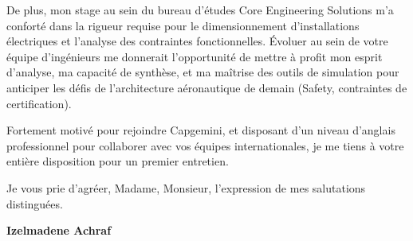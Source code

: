 \documentclass[10pt,a4paper]{../../altacv}
\begin{document}
\vspace{0.4cm}

De plus, mon stage au sein du bureau d'études Core Engineering Solutions m'a conforté dans la rigueur requise pour le dimensionnement d'installations électriques et l'analyse des contraintes fonctionnelles. Évoluer au sein de votre équipe d'ingénieurs me donnerait l'opportunité de mettre à profit mon esprit d'analyse, ma capacité de synthèse, et ma maîtrise des outils de simulation pour anticiper les défis de l'architecture aéronautique de demain (Safety, contraintes de certification).

\vspace{0.4cm}

Fortement motivé pour rejoindre Capgemini, et disposant d'un niveau d'anglais professionnel pour collaborer avec vos équipes internationales, je me tiens à votre entière disposition pour un premier entretien.

\vspace{0.5cm}

Je vous prie d'agréer, Madame, Monsieur, l'expression de mes salutations distinguées.

\vfill

\begin{flushright}
  \Large\color{emphasis}\textbf{Izelmadene Achraf}
\end{flushright}
\end{document}
